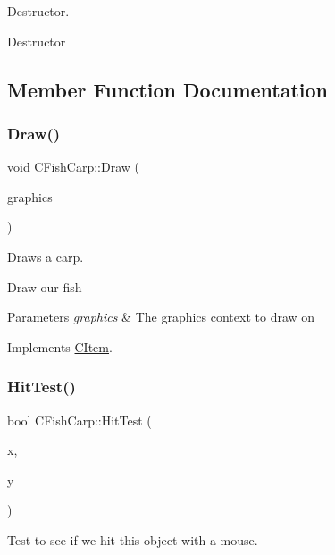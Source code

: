Destructor. 

Destructor 

\subsection{Member Function Documentation}
\mbox{\label{class_c_fish_carp_af0c967b07054d90f7b5c2fbfff9e95fb}} 
\subsubsection{\texorpdfstring{Draw()}{Draw()}}
{\footnotesize\ttfamily void C\+Fish\+Carp\+::\+Draw (\begin{DoxyParamCaption}\item[{Gdiplus\+::\+Graphics $\ast$}]{graphics }\end{DoxyParamCaption})\hspace{0.3cm}{\ttfamily [virtual]}}



Draws a carp. 

Draw our fish 
\begin{DoxyParams}{Parameters}
{\em graphics} & The graphics context to draw on \\
\hline
\end{DoxyParams}


Implements \hyperlink{class_c_item_a7ef8448d0c4bc53d0f1943a4dc817f6f}{C\+Item}.

\mbox{\label{class_c_fish_carp_a8e5c6ea5402085533d7535d4524f7fd6}} 
\subsubsection{\texorpdfstring{Hit\+Test()}{HitTest()}}
{\footnotesize\ttfamily bool C\+Fish\+Carp\+::\+Hit\+Test (\begin{DoxyParamCaption}\item[{int}]{x,  }\item[{int}]{y }\end{DoxyParamCaption})\hspace{0.3cm}{\ttfamily [virtual]}}



Test to see if we hit this object with a mouse. 


